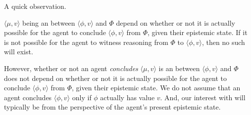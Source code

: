\begin{note}
  A quick observation.

  \(\langle \mu,v \rangle\) being an \itp{} between \(\langle \phi,v \rangle\) and \(\Phi\) depend on whether or not it is actually possible for the agent to conclude \(\langle \phi,v \rangle\) from \(\Phi\), given their epistemic state.
  If it is not possible for the agent to witness reasoning from \(\Phi\) to \(\langle \phi,v \rangle\), then no such \itp{} will exist.

  However, whether or not an agent \emph{concludes} \(\langle \mu,v \rangle\) is an \itp{} between \(\langle \phi,v \rangle\) and \(\Phi\) does not depend on whether or not it is actually possible for the agent to conclude \(\langle \phi,v \rangle\) from \(\Phi\), given their epistemic state.
  We do not assume that an agent concludes \(\langle \phi,v \rangle\) only if \(\phi\) actually has value \(v\).
  And, our interest with  will typically be from the perspective of the agent's present epistemic state.
\end{note}

